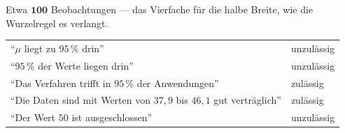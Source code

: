 \begin{aufgabe}
Etwa $\mathbf{100}$ Beobachtungen --- das Vierfache für die halbe Breite, wie die Wurzelregel es verlangt.

\begin{center}
{\small
\renewcommand{\arraystretch}{1.45}
\begin{tabular}{@{}P{4.4cm}P{3.4cm}@{}}
\toprule
\enquote{$\mu$ liegt zu $95\,\%$ drin} & \textcolor{akzent}{unzulässig}\\
\enquote{$95\,\%$ der Werte liegen drin} & \textcolor{akzent}{unzulässig}\\
\enquote{Das Verfahren trifft in $95\,\%$ der Anwendungen} & \textcolor{gruen}{zulässig}\\
\enquote{Die Daten sind mit Werten von $37{,}9$ bis $46{,}1$ gut verträglich} & \textcolor{gruen}{zulässig}\\
\enquote{Der Wert $50$ ist ausgeschlossen} & \textcolor{akzent}{unzulässig}\\
\bottomrule
\end{tabular}}
\end{center}
\end{aufgabe}

